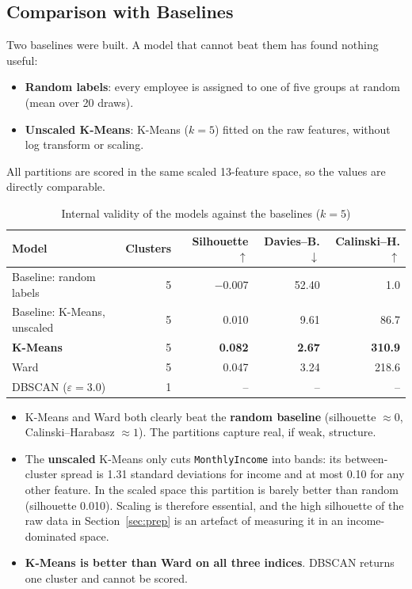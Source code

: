 \documentclass[12pt,a4paper]{article}
\begin{document}
\subsection{Comparison with Baselines}

Two baselines were built. A model that cannot beat them has found nothing
useful:
\begin{itemize}
  \item \textbf{Random labels}: every employee is assigned to one of five
  groups at random (mean over 20 draws).
  \item \textbf{Unscaled K-Means}: K-Means ($k=5$) fitted on the raw features,
  without log transform or scaling.
\end{itemize}
All partitions are scored in the same scaled 13-feature space, so the values
are directly comparable.

\begin{table}[H]
\centering
\caption{Internal validity of the models against the baselines ($k=5$)}
\label{tab:baselines}
\small
\begin{tabular}{lrrrr}
\toprule
\textbf{Model} & \textbf{Clusters} & \textbf{Silhouette $\uparrow$}
& \textbf{Davies--B. $\downarrow$} & \textbf{Calinski--H. $\uparrow$}\\
\midrule
Baseline: random labels      & 5 & $-0.007$ & 52.40 & 1.0\\
Baseline: K-Means, unscaled  & 5 & 0.010    & 9.61  & 86.7\\
\midrule
\textbf{K-Means}             & 5 & \textbf{0.082} & \textbf{2.67} & \textbf{310.9}\\
Ward                         & 5 & 0.047    & 3.24  & 218.6\\
DBSCAN ($\varepsilon = 3.0$) & 1 & --       & --    & --\\
\bottomrule
\end{tabular}
\end{table}

\begin{itemize}
  \item K-Means and Ward both clearly beat the \textbf{random baseline}
  (silhouette $\approx 0$, Calinski--Harabasz $\approx 1$). The partitions
  capture real, if weak, structure.
  \item The \textbf{unscaled} K-Means only cuts \texttt{MonthlyIncome} into
  bands: its between-cluster spread is 1.31 standard deviations for income and
  at most 0.10 for any other feature. In the scaled space this partition is
  barely better than random (silhouette 0.010). Scaling is therefore
  essential, and the high silhouette of the raw data in
  Section~\ref{sec:prep} is an artefact of measuring it in an
  income-dominated space.
  \item \textbf{K-Means is better than Ward on all three indices}. DBSCAN
  returns one cluster and cannot be scored.
\end{itemize}
\end{document}
